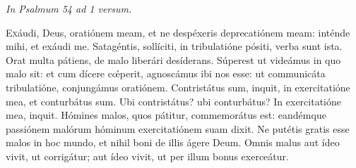 
{\hfill \textit{In Psalmum 54 ad 1 versum.}}

\lettrine{E}{x}áudi, Deus, oratiónem meam, et ne despéxeris deprecatiónem meam: inténde mihi, et exáudi me. Satagéntis, sollíciti, in tribulatióne pósiti, verba sunt ista. Orat multa pátiens, de malo liberári desíderans. Súperest ut videámus in quo malo sit: et cum dícere cœ́perit, agnoscámus ibi nos esse: ut communicáta tribulatióne, conjungámus oratiónem. Contristátus sum, inquit, in exercitatióne mea, et conturbátus sum. Ubi contristátus? ubi conturbátus? In exercitatióne mea, inquit. Hómines malos, quos pátitur, commemorátus est: eandémque passiónem malórum hóminum exercitatiónem suam dixit. Ne putétis gratis esse malos in hoc mundo, et nihil boni de illis ágere Deum. Omnis malus aut ídeo vivit, ut corrigátur; aut ídeo vivit, ut per illum bonus exerceátur.